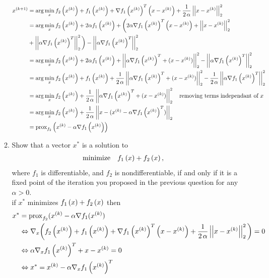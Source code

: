\documentclass[12pt,twoside]{article}
\begin{document}
\begin{enumerate}
\begin{enumerate}
\begin{align*}
   x^{(k+1)}  	&=  \arg \min_{x}  f_2\left( x^{(k)} \right) + f_1\left( x^{(k)} \right) + \nabla f_1\left( x^{(k)} \right)^T\left( x-x^{(k)} \right) +  \frac{1}{2 \, \alpha } \left|\left| x-x^{(k)} \right|\right| _{2}^2 \\
			&=   \arg \min_{x}  f_2\left( x^{(k)} \right) + 2 \alpha  f_1\left( x^{(k)} \right) + \bigg( 2 \alpha \nabla f_1\left( x^{(k)} \right)^T\left( x-x^{(k)} \right) + \left|\left| x-x^{(k)} \right|\right| _{2}^2  \\
			&+  \left|\left| \alpha  \nabla f_1\left( x^{(k)} \right)^T \right|\right| _{2}^2 \bigg) -  \left|\left| \alpha  \nabla f_1\left( x^{(k)} \right)^T \right|\right| _{2}^2 \\
			&=  \arg \min_{x}  f_2\left( x^{(k)} \right) + 2 \alpha  f_1\left( x^{(k)} \right) +  \left|\left| \alpha  \nabla f_1\left( x^{(k)} \right)^T +  (x-x^{(k)})  \right|\right| _{2}^2 -  \left|\left| \alpha  \nabla f_1\left( x^{(k)} \right)^T \right|\right| _{2}^2 \\
			&=  \arg \min_{x}  f_2\left( x^{(k)} \right) + f_1\left( x^{(k)} \right) +  \frac{1}{2 \, \alpha }   \left|\left| \alpha  \nabla f_1\left( x^{(k)} \right)^T +  (x-x^{(k)})  \right|\right| _{2}^2 -  
			\frac{1}{2 \, \alpha }    \left|\left| \alpha  \nabla f_1\left( x^{(k)} \right)^T \right|\right| _{2}^2 \\
			&=   \arg \min_{x}  f_2\left( x^{(k)} \right) +   \frac{1}{2 \, \alpha }   \left|\left| \alpha  \nabla f_1\left( x^{(k)} \right)^T +  (x-x^{(k)})  \right|\right| _{2}^2 \text{ ~ removing terms independant of } x\\
			&=   \arg \min_{x}  f_2\left( x^{(k)} \right) +   \frac{1}{2 \, \alpha }   \left|\left| x - (x^{(k)} - \alpha  \nabla f_1\left( x^{(k)} \right)^T ) \right|\right| _{2} \\
			 &= \operatorname{prox}_{f_2}\left( x^{(k)} - \alpha \nabla f_1\left( x^{(k)} \right) \right) \\
\end{align*}

\item Show that a vector $x^{\ast}$ is a solution to
\begin{align}
 \operatorname{minimize} \quad & f_1\left( x \right) + f_2\left( x \right),
\end{align}
where $f_1$ is differentiable, and $f_2$ is nondifferentiable, if and only if it is a fixed point of the iteration you proposed in the previous question for any $\alpha > 0$.\\
if $x^{\ast}$ minimizes $f_1\left( x \right) + f_2\left( x \right)$  then
\begin{align*}
	x^{\ast} &= \operatorname{prox}_{f_2} (x^{(k)}  - \alpha \nabla f_1 (x^{(k)}) \\
	& \Leftrightarrow \nabla_x \bigg( f_2\left( x^{(k)} \right) + f_1\left( x^{(k)} \right) + \nabla f_1\left( x^{(k)} \right)^T\left( x-x^{(k)} \right) +  \frac{1}{2 \, \alpha }\left|\left| x-x^{(k)} \right|\right| _{2}^2 \bigg) = 0\\
	& \Leftrightarrow \alpha  \nabla_x f_1\left( x^{(k)} \right)^T + x - x^{(k)} = 0 \\
	& \Leftrightarrow  x^{\ast} =  x^{(k)}  - \alpha \nabla_x f_1\left( x^{(k)} \right)^T  \\
\end{align*}


\end{enumerate}
\end{enumerate}
\end{document}
